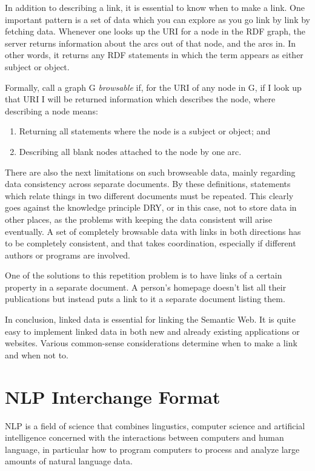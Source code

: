 \documentclass[thesis=M,english,hidelinks]{FITthesis}[2019/12/23]
\begin{document}
In addition to describing a link, it is essential to know when to make a link. One important pattern is a set of data which you can explore as you go link by link by fetching data.   Whenever one looks up the \gls{URI} for a node in the RDF graph, the server returns information about the arcs out of that node, and the arcs in.  In other words, it returns any RDF statements in which the term appears as either subject or object.

Formally, call a graph G \textit{browsable} if, for  the \gls{URI} of any node in G, if I look up that \gls{URI} I will be returned information which describes the node, where describing a node means:
\begin{enumerate}
	\item Returning all statements where the node is a subject or object; and
	\item Describing all blank nodes attached to the node by one arc.
\end{enumerate}

There are also the next limitations on such browseable data, mainly regarding data consistency across separate documents. By these definitions, statements which relate things in two different documents must be repeated. This clearly goes against the knowledge principle \gls{DRY}, or in this case, not to store data in other places, as the problems with keeping the data consistent will arise eventually. A set of completely browsable data with links in both directions has to be completely consistent, and that takes coordination, especially if different authors or programs are involved.

One of the solutions to this repetition problem is to have links of a certain property in a separate document.   A person's homepage doesn't list all their publications but instead puts a link to it a separate document listing them.

In conclusion, linked data is essential for linking the Semantic Web. It is quite easy to implement linked data in both new and already existing applications or websites. Various common-sense considerations determine when to make a link and when not to.

\section{NLP Interchange Format}

\gls{NLP} is a field of science that combines lingustics, computer science and artificial intelligence concerned with the interactions between computers and human language, in particular how to program computers to process and analyze large amounts of natural language data.
\end{document}
